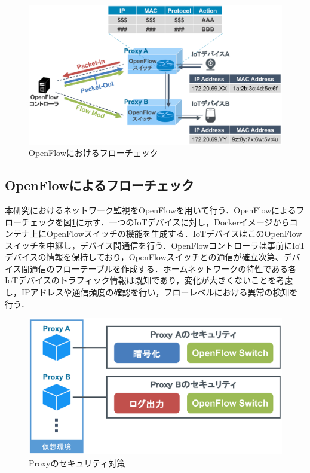 \documentclass[Japanese]{dicomopapers}
\begin{document}
\begin{figure}[!tb]
	\centering
	\includegraphics[width=\linewidth]{img/openflow.eps}
	\caption{OpenFlowにおけるフローチェック}
	\label{fig:openflow}
\end{figure}

\subsection{OpenFlowによるフローチェック}
本研究におけるネットワーク監視をOpenFlowを用いて行う．OpenFlowによるフローチェックを図\ref{fig:openflow}に示す．一つのIoTデバイスに対し，Dockerイメージからコンテナ上にOpenFlowスイッチの機能を生成する．IoTデバイスはこのOpenFlowスイッチを中継し，デバイス間通信を行う．OpenFlowコントローラは事前にIoTデバイスの情報を保持しており，OpenFlowスイッチとの通信が確立次第、デバイス間通信のフローテーブルを作成する．ホームネットワークの特性である各IoTデバイスのトラフィック情報は既知であり，変化が大きくないことを考慮し，IPアドレスや通信頻度の確認を行い，フローレベルにおける異常の検知を行う．

\begin{figure}[!tb]
	\centering
	\includegraphics[width=\linewidth]{img/security.eps}
	\caption{Proxyのセキュリティ対策}
	\label{fig:security}
\end{figure}
\end{document}
